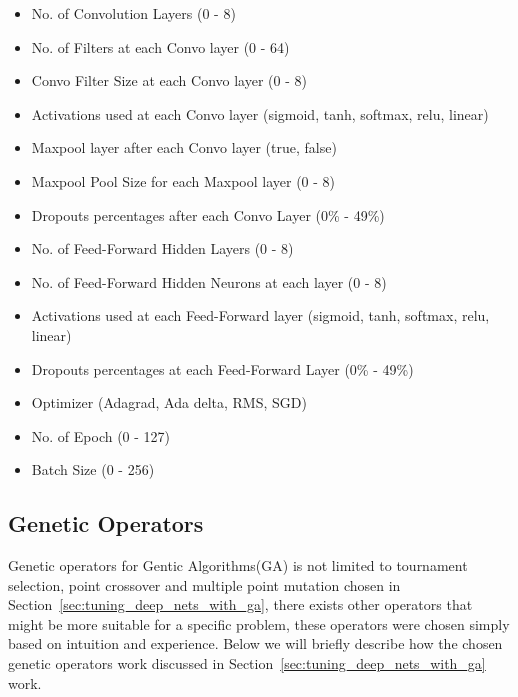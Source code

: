 \begin{itemize}
	\vspace{-0.5cm}
	\setlength{\itemsep}{0pt}
	\setlength{\parskip}{0pt}
	\setlength{\parsep}{0pt}
	
	\item{No. of Convolution Layers (0 - 8)}
	\item{No. of Filters at each Convo layer (0 - 64)}
	\item{Convo Filter Size at each Convo layer (0 - 8)}
	\item{Activations used at each Convo layer (sigmoid, tanh, softmax, relu, linear)}
	\\
	
	\item{Maxpool layer after each Convo layer (true, false)}
	\item{Maxpool Pool Size for each Maxpool layer (0 - 8)}
	\item{Dropouts percentages after each Convo Layer (0\% - 49\%)}
	\\
	
	\item{No. of Feed-Forward Hidden Layers (0 - 8)}
	\item{No. of Feed-Forward Hidden Neurons at each layer (0 - 8)}
	\item{Activations used at each Feed-Forward layer (sigmoid, tanh, softmax, relu, linear)}
	\item{Dropouts percentages at each Feed-Forward Layer (0\% - 49\%)}
	\\
	
	\item{Optimizer (Adagrad, Ada delta, RMS, SGD)}
	\item{No. of Epoch (0 - 127)}
	\item{Batch Size (0 - 256)}
\end{itemize}


\subsection{Genetic Operators}
\label{sup:genetic_operators}
Genetic operators for Gentic Algorithms(GA) is not limited to tournament selection, point crossover and multiple point mutation chosen in Section~\ref{sec:tuning_deep_nets_with_ga}, there exists other operators that might be more suitable for a specific problem, these operators were chosen simply based on intuition and experience. Below we will briefly describe how the chosen genetic operators work discussed in Section~\ref{sec:tuning_deep_nets_with_ga} work.


